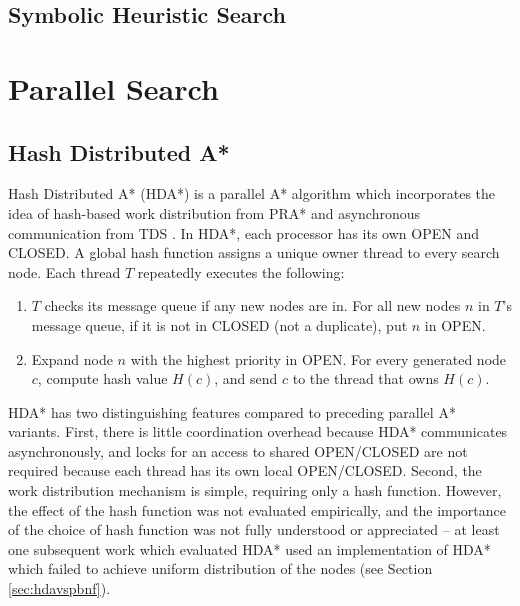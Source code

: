 \documentclass{book}
\begin{document}
\subsection{Symbolic Heuristic Search}


\section{Parallel Search}

\subsection{Hash Distributed A*}

Hash Distributed A* (HDA*) \cite{kishimotofb13} is a parallel A* algorithm 
which incorporates the idea of hash-based work distribution from  PRA* \cite{evett1995massively} and asynchronous communication from TDS \cite{romein1999transposition}.
In HDA*, 
each processor has its own OPEN and CLOSED.
A global hash function assigns a unique owner thread to every search node.
Each thread $T$ repeatedly executes the following: 
\begin{enumerate}
	\item 
           $T$ checks its message queue if any new nodes are in. For all new nodes $n$ in $T$'s message queue, if it is not in CLOSED (not a duplicate), put $n$ in OPEN. %
	\item 
           Expand node $n$ with the highest priority in OPEN. For every generated node $c$, compute hash value $H(c)$, and send $c$ to the thread that owns $H(c)$. %
\end{enumerate}


HDA* has two distinguishing features compared to preceding parallel A* variants.
First, there is little coordination overhead because HDA* communicates asynchronously, and %
locks for an access to shared OPEN/CLOSED are not required because each thread has its own local OPEN/CLOSED.
Second, the work distribution mechanism is simple, requiring only a hash function.
However, the effect of the hash function was not evaluated empirically, and the importance of the choice of hash function was not fully understood or appreciated --
at least one subsequent work which evaluated HDA* used an implementation of HDA* which failed to achieve uniform distribution of the nodes (see Section \ref{sec:hdavspbnf}).%
\end{document}
